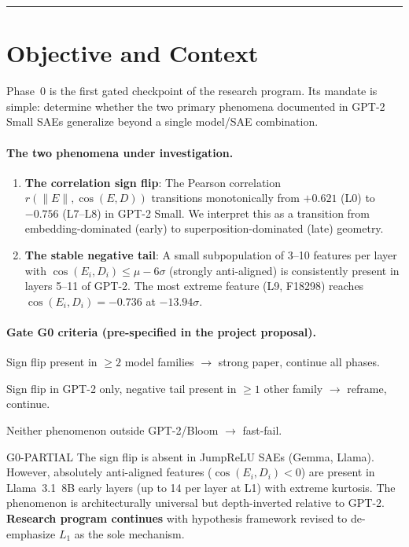 \documentclass[11pt,a4paper]{article}
\newcommand{\cosED}{\cos(E_i, D_i)}
\newcommand{\rPearson}{r(\|E\|, \cos(E,D))}
\begin{document}
\vspace{0.5em}\hrule\vspace{0.5em}
\tableofcontents
\newpage

\section{Objective and Context}
\label{sec:objective}

Phase~0 is the first gated checkpoint of the research program. Its mandate is simple: determine whether the two primary phenomena documented in GPT-2 Small SAEs generalize beyond a single model/SAE combination.

\paragraph{The two phenomena under investigation.}
\begin{enumerate}[nosep]
  \item \textbf{The correlation sign flip}: The Pearson correlation $\rPearson$ transitions monotonically from $+0.621$ (L0) to $-0.756$ (L7--L8) in GPT-2 Small. We interpret this as a transition from embedding-dominated (early) to superposition-dominated (late) geometry.
  \item \textbf{The stable negative tail}: A small subpopulation of 3--10 features per layer with $\cosED \leq \mu - 6\sigma$ (strongly anti-aligned) is consistently present in layers 5--11 of GPT-2. The most extreme feature (L9, F18298) reaches $\cosED = -0.736$ at $-13.94\sigma$.
\end{enumerate}

\paragraph{Gate G0 criteria (pre-specified in the project proposal).}
\begin{description}[nosep, leftmargin=1.5em]
  \item[G0-YES:] Sign flip present in $\geq 2$ model families $\to$ strong paper, continue all phases.
  \item[G0-PARTIAL:] Sign flip in GPT-2 only, negative tail present in $\geq 1$ other family $\to$ reframe, continue.
  \item[G0-NO:] Neither phenomenon outside GPT-2/Bloom $\to$ fast-fail.
\end{description}

\begin{gatedecision}{G0-PARTIAL}
  The sign flip is absent in JumpReLU SAEs (Gemma, Llama). However, absolutely anti-aligned features ($\cosED < 0$) are present in Llama~3.1~8B early layers (up to 14 per layer at L1) with extreme kurtosis. The phenomenon is architecturally universal but depth-inverted relative to GPT-2. \textbf{Research program continues} with hypothesis framework revised to de-emphasize $L_1$ as the sole mechanism.
\end{gatedecision}
\end{document}
